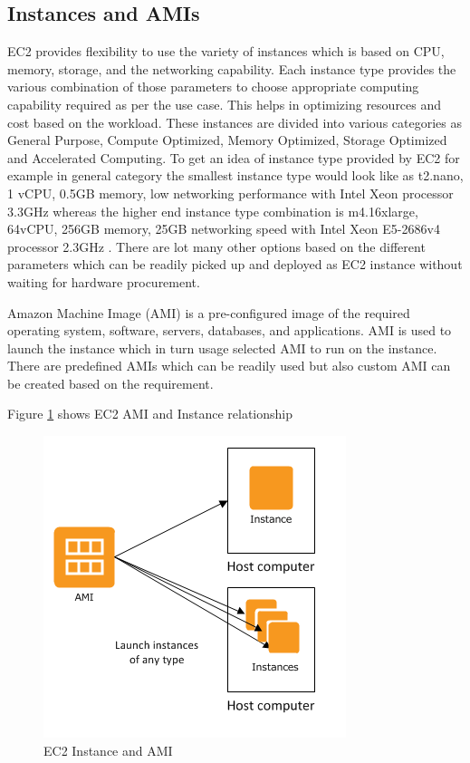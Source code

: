 \subsection{Instances and AMIs}
EC2 provides flexibility to use the variety of instances which is based on CPU, memory, storage, and the networking capability. Each instance type provides the various combination of those parameters to choose appropriate computing capability required as per the use case. This helps in optimizing resources and cost based on the workload. These instances are divided into various categories as General Purpose, Compute Optimized, Memory Optimized, Storage Optimized and Accelerated Computing. To get an idea of instance type provided by EC2 for example in general category the smallest instance type would look like as t2.nano, 1 vCPU, 0.5GB memory, low networking performance with Intel Xeon processor 3.3GHz whereas the higher end instance type combination is m4.16xlarge, 64vCPU, 256GB memory, 25GB networking speed with Intel Xeon E5-2686v4 processor 2.3GHz \cite{www-aws-ec2instance}. There are lot many other options based on the different parameters which can be readily picked up and deployed as EC2 instance without waiting for hardware procurement.

Amazon Machine Image (AMI) \cite{www-aws-ec2instance} is a pre-configured image of the required operating system, software, servers, databases, and applications. AMI is used to launch the instance which in turn usage selected AMI to run on the instance. There are predefined AMIs which can be readily used but also custom AMI can be created based on the requirement.

Figure \ref{f:ec2-ami-instance} shows EC2 AMI and Instance relationship
\begin{figure}[!ht]
  \centering\includegraphics[width=\columnwidth]{images/ec2AMI.PNG}
  \caption{EC2 Instance and AMI \cite{www-aws-ec2instance}}\label{f:ec2-ami-instance}
\end{figure}

